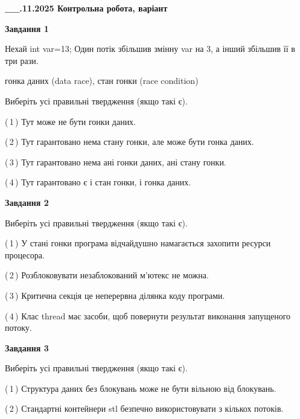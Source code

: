 \documentclass[12pt, ukrainian]{article}
\begin{document}
\begin {large}

\textbf{\_\_.11.2025 Контрольна робота, варіант  }\par


{

\begin{center}
\textbf{Завдання 1}
\end{center}
Нехай int var=13; Один потік збільшив змінну var на 3, а інший збільшив її в три рази.

гонка даних (data race), стан гонки (race condition)

Виберіть усі правильні твердження (якщо такі є).\par
\vspace{2mm}
(\,1\,) Тут може не бути гонки даних.%

(\,2\,) Тут гарантовано нема стану гонки, але може бути гонка даних.%

(\,3\,) Тут гарантовано нема ані гонки даних, ані стану гонки.%

(\,4\,) Тут гарантовано є і стан гонки, і гонка даних.%



\begin{center}
\textbf{Завдання 2}
\end{center}
Виберіть усі правильні твердження (якщо такі є).\par
\vspace{2mm}

(\,1\,) У стані гонки програма відчайдушно намагається захопити ресурси процесора.%

(\,2\,) Розблоковувати незаблокований м’ютекс не можна.%

(\,3\,) Критична секція це неперервна ділянка коду програми.%

(\,4\,) Клас thread має засоби, щоб повернути результат виконання запущеного потоку.%



\begin{center}
\textbf{Завдання 3}
\end{center}
Виберіть усі правильні твердження (якщо такі є).\par
\vspace{2mm}

(\,1\,) Структура даних без блокувань може не бути вільною від блокувань.%

(\,2\,) Стандартні контейнери stl безпечно використовувати з кількох потоків.%

}
\end{large}
\end{document}

